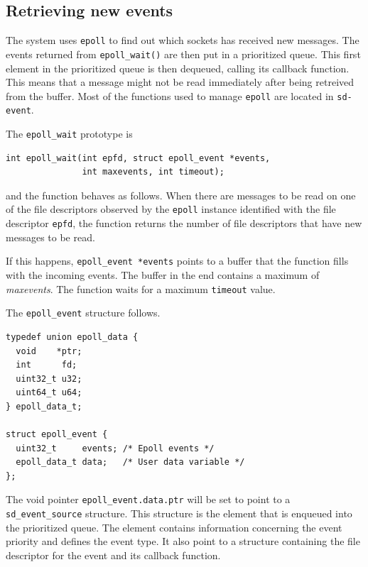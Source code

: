 \documentclass[nobiblatex]{LTHthesis}
\newcommand{\martina}[1]
  {\todo[inline,color=red!30,caption={}]{\textbf{Martina:} #1}}
\begin{document}
\subsection{Retrieving new events}

The system uses \texttt{epoll} to find out which sockets has received new 
messages. The events returned from \texttt{epoll\_wait()} are then put in 
a prioritized queue. This first element in the prioritized queue is then 
dequeued, calling its callback function. This means that a message might 
not be read immediately after being retreived from the buffer. Most of the
functions used to manage \texttt{epoll} are located in \texttt{sd-event}.

\martina{What is sd-event?}

The \texttt{epoll\_wait} prototype is
\begin{verbatim}
int epoll_wait(int epfd, struct epoll_event *events,
               int maxevents, int timeout);	 
\end{verbatim}
and the function behaves as follows. When there are messages to be read on 
one of the file descriptors observed by the \texttt{epoll} instance 
identified with the file descriptor \texttt{epfd}, the function returns 
the number of file descriptors that have new messages to be read. 

If this happens, \texttt{epoll\_event *events} points to a buffer that 
the function fills with the incoming events. The buffer in the end contains
a maximum of \emph{maxevents}. The function waits for a maximum
\texttt{timeout} value.

The \texttt{epoll\_event} structure follows.
\begin{lstlisting}
typedef union epoll_data {
  void    *ptr;
  int      fd;
  uint32_t u32;
  uint64_t u64;
} epoll_data_t;

struct epoll_event {
  uint32_t     events; /* Epoll events */
  epoll_data_t data;   /* User data variable */
};
\end{lstlisting}

The void pointer \texttt{epoll\_event.data.ptr} will be set to point to a 
\texttt{sd\_event\_source} structure. This structure is the element that is
enqueued into the prioritized queue. The element contains information
concerning the event priority and defines the event type. It also point to
a structure containing the file descriptor for the event and its callback
function.
\end{document}
